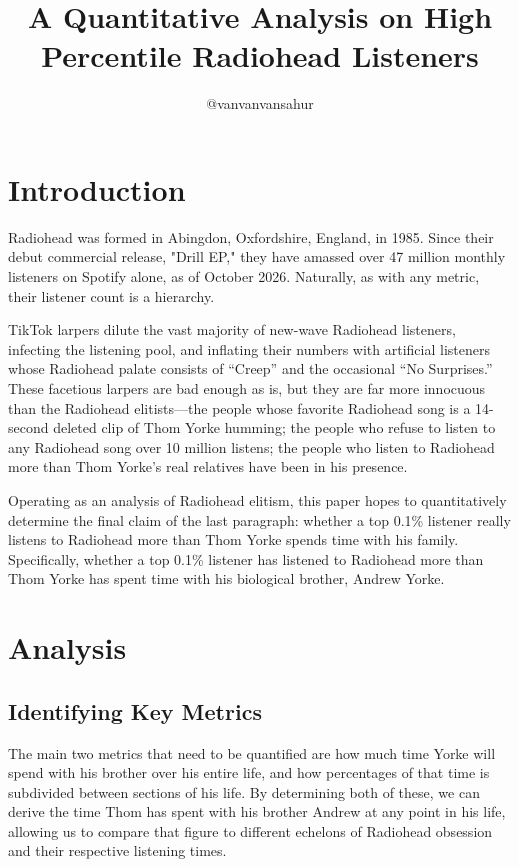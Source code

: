 \documentclass{article}
\title{A Quantitative Analysis on High Percentile Radiohead Listeners}
\author{@vanvanvansahur}
\begin{document}
\maketitle

\section{Introduction}

Radiohead was formed in Abingdon, Oxfordshire, England, in 1985. Since their debut commercial release, "Drill EP," they have amassed over 47 million monthly listeners on Spotify alone, as of October 2026. Naturally, as with any metric, their listener count is a hierarchy. 

TikTok larpers dilute the vast majority of new-wave Radiohead listeners, infecting the listening pool, and inflating their numbers with artificial listeners whose Radiohead palate consists of ``Creep'' and the occasional ``No Surprises.'' These facetious larpers are bad enough as is, but they are far more innocuous than the Radiohead elitists---the people whose favorite Radiohead song is a 14-second deleted clip of Thom Yorke humming; the people who refuse to listen to any Radiohead song over 10 million listens; the people who listen to Radiohead more than Thom Yorke's real relatives have been in his presence.

Operating as an analysis of Radiohead elitism, this paper hopes to quantitatively determine the final claim of the last paragraph: whether a top 0.1\% listener really listens to Radiohead more than Thom Yorke spends time with his family. Specifically, whether a top 0.1\% listener has listened to Radiohead more than Thom Yorke has spent time with his biological brother, Andrew Yorke.

\section{Analysis}

\subsection{Identifying Key Metrics}

The main two metrics that need to be quantified are how much time Yorke will spend with his brother over his entire life, and how percentages of that time is subdivided between sections of his life. By determining both of these, we can derive the time Thom has spent with his brother Andrew at any point in his life, allowing us to compare that figure to different echelons of Radiohead obsession and their respective listening times. 
\end{document}
